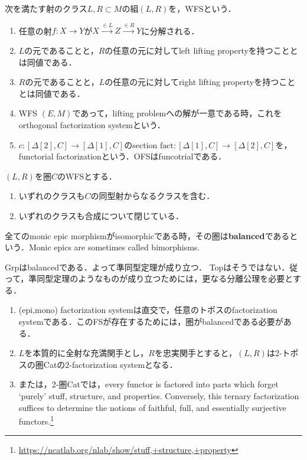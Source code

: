 \documentclass[uplatex,dvipdfmx]{jsreport}
\begin{document}
\begin{definition}
    次を満たす射のクラス$L,R\subset M$の組$(L,R)$を，WFSという．
    \begin{enumerate}
        \item 任意の射$f:X\to Y$が$X\xrightarrow{\in L}Z\xrightarrow{\in R}Y$に分解される．
        \item $L$の元であることと，$R$の任意の元に対してleft lifting propertyを持つこととは同値である．
        \item $R$の元であることと，$L$の任意の元に対してright lifting propertyを持つこととは同値である．
        \item WFS $(E,M)$であって，lifting problemへの解が一意である時，これをorthogonal factorization systemという．
        \item $c:[\Delta[2],C]\to[\Delta[1],C]$のsection $\mathrm{fact}:[\Delta[1],C]\to[\Delta[2],C]$を，functorial factorizationという．OFSはfuncotrialである．
    \end{enumerate}
\end{definition}

\begin{proposition}
    $(L,R)$を圏$C$のWFSとする．
    \begin{enumerate}
        \item いずれのクラスも$C$の同型射からなるクラスを含む．
        \item いずれのクラスも合成について閉じている．
    \end{enumerate}
\end{proposition}

\begin{definition}[balanced]
    全てのmonic epic morphismがisomorphicである時，その圏は\textbf{balanced}であるという．Monic epics are sometimes called bimorphisms.
\end{definition}
\begin{remark}
    Grpはbalancedである．よって準同型定理が成り立つ．
    Topはそうではない．従って，準同型定理のようなものが成り立つためには，更なる分離公理を必要とする．
\end{remark}

\begin{example}
    \begin{enumerate}
        \item (epi,mono) factorization systemは直交で，任意のトポスのfactorization systemである．このFSが存在するためには，圏がbalancedである必要がある．
        \item $L$を本質的に全射な充満関手とし，$R$を忠実関手とすると，$(L,R)$は2-トポスの圏Catの2-factorization systemとなる．
        \item または，2-圏Catでは，every functor is factored into parts which forget ‘purely’ stuff, structure, and properties. Conversely, this ternary factorization suffices to determine the notions of faithful, full, and essentially surjective functors.\footnote{\url{https://ncatlab.org/nlab/show/stuff,+structure,+property}}
    \end{enumerate}
\end{example}
\end{document}
